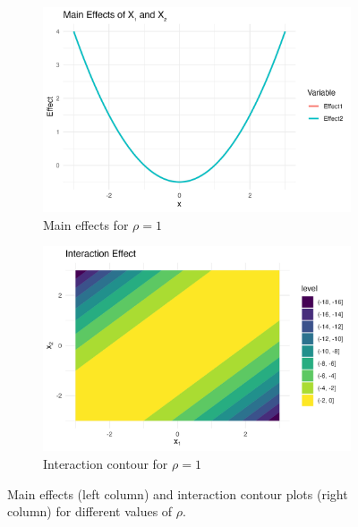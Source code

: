 \begin{figure}[htpb]
    \vspace{0.5em}
    \begin{subfigure}[t]{0.49\textwidth}
        \centering
        \includegraphics[width=\textwidth]{images/interaction_a1p00_a2p00_a11p00_a22p00_a12p10_rhop10_main.png}
        \caption{Main effects for $\rho = 1$}
    \end{subfigure}%
    \hfill
    \begin{subfigure}[t]{0.49\textwidth}
        \centering
        \includegraphics[width=\textwidth]{images/interaction_a1p00_a2p00_a11p00_a22p00_a12p10_rhop10_interaction.png}
        \caption{Interaction contour for $\rho = 1$}
    \end{subfigure}

    \caption{Main effects (left column) and interaction contour plots (right column) for different values of $\rho$.}
    \label{fig:interaction_combined}
\end{figure}



